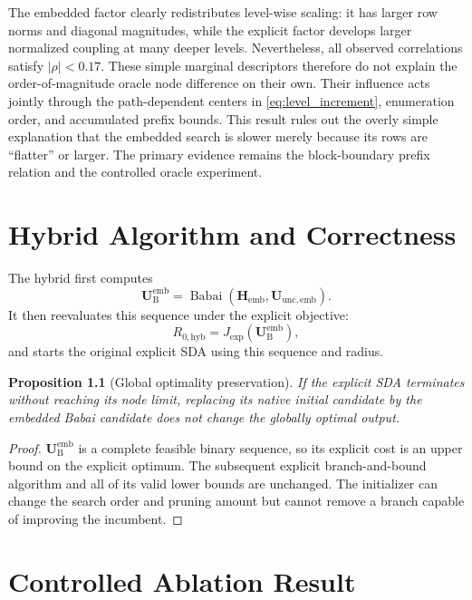 \documentclass[paper=a4,oneside,fontsize=12pt,DIV=14,headings=normal,parskip=half,headsepline,numbers=noendperiod]{scrreprt}
\newcommand{\vct}[1]{\bm{#1}}
\newcommand{\mat}[1]{\bm{#1}}
\newtheorem{proposition}{Proposition}[chapter]
\begin{document}
The embedded factor clearly redistributes level-wise scaling: it has larger row
norms and diagonal magnitudes, while the explicit factor develops larger
normalized coupling at many deeper levels.  Nevertheless, all observed
correlations satisfy $|\rho|<0.17$.  These simple marginal descriptors therefore
do not explain the order-of-magnitude oracle node difference on their own.
Their influence acts jointly through the path-dependent centers in
\cref{eq:level_increment}, enumeration order, and accumulated prefix bounds.
This result rules out the overly simple explanation that the embedded search is
slower merely because its rows are ``flatter'' or larger.  The primary evidence
remains the block-boundary prefix relation and the controlled oracle experiment.

\chapter{Hybrid Algorithm and Correctness}

The hybrid first computes
\begin{equation}
 \vct U_{\mathrm B}^{\mathrm{emb}}
 =\operatorname{Babai}(\mat H_{\mathrm{emb}},
                       \vct U_{\mathrm{unc,emb}}).
\end{equation}
It then reevaluates this sequence under the explicit objective:
\begin{equation}
 R_{0,\mathrm{hyb}}
 =J_{\mathrm{exp}}(\vct U_{\mathrm B}^{\mathrm{emb}}),
\end{equation}
and starts the original explicit SDA using this sequence and radius.

\begin{proposition}[Global optimality preservation]
If the explicit SDA terminates without reaching its node limit, replacing its
native initial candidate by the embedded Babai candidate does not change the
globally optimal output.
\end{proposition}
\begin{proof}
$\vct U_{\mathrm B}^{\mathrm{emb}}$ is a complete feasible binary sequence, so
its explicit cost is an upper bound on the explicit optimum.  The subsequent
explicit branch-and-bound algorithm and all of its valid lower bounds are
unchanged.  The initializer can change the search order and pruning amount but
cannot remove a branch capable of improving the incumbent.
\end{proof}

\chapter{Controlled Ablation Result}
\end{document}
